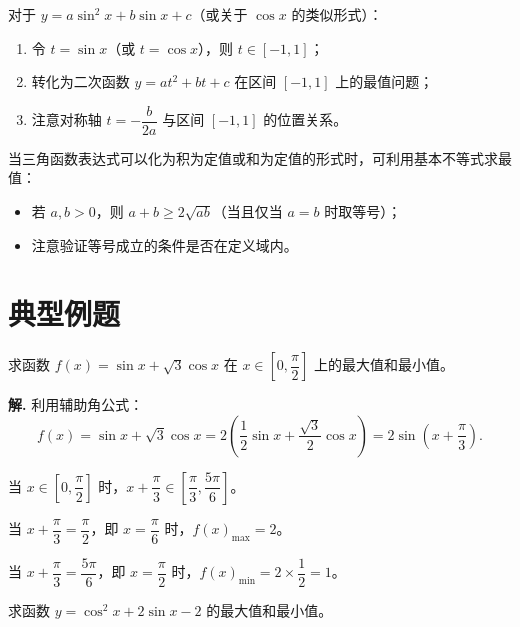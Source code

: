 \documentclass[11pt]{ctexrep}
\begin{document}
\begin{property}[换元法求最值]
    对于 $y = a\sin^2 x + b\sin x + c$（或关于 $\cos x$ 的类似形式）：
    \begin{enumerate}
        \item 令 $t = \sin x$（或 $t = \cos x$），则 $t \in [-1, 1]$；
        \item 转化为二次函数 $y = at^2 + bt + c$ 在区间 $[-1, 1]$ 上的最值问题；
        \item 注意对称轴 $t = -\dfrac{b}{2a}$ 与区间 $[-1, 1]$ 的位置关系。
    \end{enumerate}
\end{property}

\begin{property}[基本不等式在三角函数中的应用]
    当三角函数表达式可以化为积为定值或和为定值的形式时，可利用基本不等式求最值：
    \begin{itemize}
        \item 若 $a, b > 0$，则 $a + b \geqslant 2\sqrt{ab}$（当且仅当 $a = b$ 时取等号）；
        \item 注意验证等号成立的条件是否在定义域内。
    \end{itemize}
\end{property}

\section*{典型例题}

\begin{example}[辅助角公式求最值]
    求函数 $f(x) = \sin x + \sqrt{3}\cos x$ 在 $x \in \left[0, \dfrac{\pi}{2}\right]$ 上的最大值和最小值。
\end{example}

\textbf{解.} 利用辅助角公式：
\[
    f(x) = \sin x + \sqrt{3}\cos x = 2\left(\frac{1}{2}\sin x + \frac{\sqrt{3}}{2}\cos x\right) = 2\sin\left(x + \frac{\pi}{3}\right).
\]

当 $x \in \left[0, \dfrac{\pi}{2}\right]$ 时，$x + \dfrac{\pi}{3} \in \left[\dfrac{\pi}{3}, \dfrac{5\pi}{6}\right]$。

当 $x + \dfrac{\pi}{3} = \dfrac{\pi}{2}$，即 $x = \dfrac{\pi}{6}$ 时，$f(x)_{\max} = 2$。

当 $x + \dfrac{\pi}{3} = \dfrac{5\pi}{6}$，即 $x = \dfrac{\pi}{2}$ 时，$f(x)_{\min} = 2 \times \dfrac{1}{2} = 1$。

\begin{example}[换元法求最值]
    求函数 $y = \cos^2 x + 2\sin x - 2$ 的最大值和最小值。
\end{example}
\end{document}
